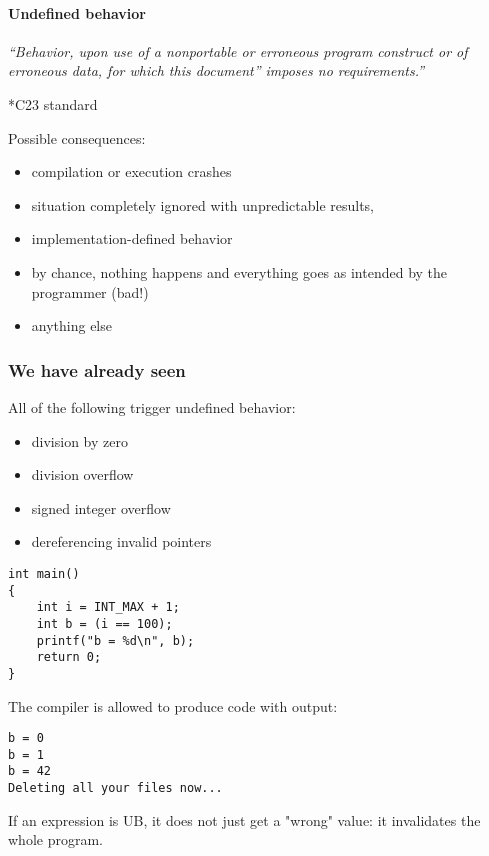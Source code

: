 \documentclass[12pt]{article}
\begin{document}
\paragraph{Undefined behavior}

\textit{``Behavior, upon use of a nonportable or erroneous program construct or of erroneous data, for which this document'' imposes no requirements.''}

\begin{flushright}
\tiny{*C23 standard}
\end{flushright}

Possible consequences:
\begin{itemize}
  \item compilation or execution crashes
  \item situation completely ignored with unpredictable results,
  \item implementation-defined behavior
  \item by chance, nothing happens and everything goes as intended by the programmer (bad!)
  \item anything else
\end{itemize}

\subsubsection{We have already seen}

All of the following trigger undefined behavior:
\begin{itemize}
  \item division by zero
  \item division overflow
  \item signed integer overflow
  \item dereferencing invalid pointers
\end{itemize}

\begin{lstlisting}
int main()
{
    int i = INT_MAX + 1;
    int b = (i == 100);
    printf("b = %d\n", b);
    return 0;
}
\end{lstlisting}

The compiler is allowed to produce code with output:

\begin{lstlisting}
b = 0
b = 1
b = 42
Deleting all your files now...
\end{lstlisting}

If an expression is UB, it does not just get a "wrong" value: it invalidates the whole program.
\end{document}
